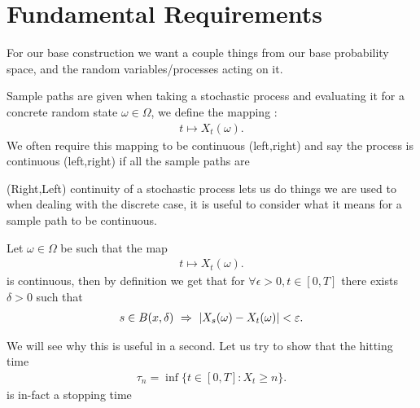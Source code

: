 \section{Fundamental Requirements }
For our base construction we want a couple things from our base probability space, and the random variables/processes acting on it.
\begin{definition}
  Sample paths are given when taking a stochastic process and evaluating it for a concrete random state $\omega  \in  \Omega $,
  we define the mapping : 
  \begin{align*}
    t \mapsto X_t(\omega )
  .\end{align*}
  We often require this mapping to be continuous (left,right) and say the process is continuous (left,right) if all the sample paths are
\end{definition}
  (Right,Left)  continuity  of a stochastic process lets us do things we are used to when dealing with the discrete case, it is useful to consider what it means 
  for a sample path to be continuous.\\[1ex]
  \begin{remark}
  Let $\omega  \in  \Omega $ be such that  the map 
  \begin{align*}
    t \mapsto X_t(\omega )
  .\end{align*}
  is continuous, then by definition we get that for $\forall  \epsilon  > 0 , t \in  [0,T]$ there exists $\delta  > 0 $ such that 
  \begin{align*}
    s \in B(x,\delta ) \ \Rightarrow \  \lvert X_s(\omega ) - X_t(\omega )\rvert < \varepsilon 
  .\end{align*}
  \end{remark}
  We will see why this is useful in a second. Let us try to show that the hitting time 
  \begin{align*}
    \tau_n = \inf \{t \in  [0,T] : X_t \ge n\}  
  .\end{align*}
  is in-fact a stopping time 
